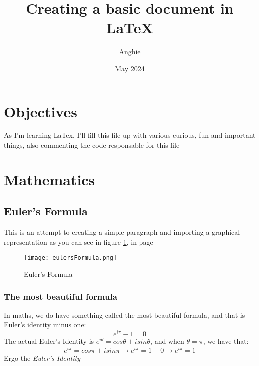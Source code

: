\documentclass{article}
\title{Creating a basic document in \LaTeX{}}
\author{Anghie}
\date{May 2024}
\begin{document}
    \maketitle

    \tableofcontents
    \newpage
    
    \section{Objectives}
    As I'm learning LaTex, I'll fill this file up with various curious, fun
    and important things, also commenting the code responsable for this file 

    \section{Mathematics}
    \subsection{Euler's Formula}
    This is an attempt to creating a simple paragraph and importing a graphical
    representation as you can see in figure \ref{fig:eulers}, in page
    \pageref{fig:eulers}

    \begin{figure}[h]
        \centering
        \texttt{[image: eulersFormula.png]}
        \caption{Euler's Formula}
        \label{fig:eulers}
    \end{figure}

    \subsubsection{The most beautiful formula}
    In maths, we do have something called the most beautiful formula, and that
    is Euler's identity minus one:
    \begin{equation}
        e^{i\pi} -  1 = 0
    \end{equation}
    The actual Euler's Identity is $e^{i\theta} = cos\theta + i sin\theta$, and
    when $\theta = \pi$, we have that:
    \begin{equation}
        e^{i\pi} = cos\pi + isin\pi \rightarrow e^{i\pi} = 1 + 0 \rightarrow
        e^{i\pi} = 1
    \end{equation}
    Ergo the \emph{Euler's Identity}
\end{document}
